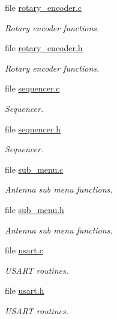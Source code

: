 \begin{CompactItemize}
\item 
file \hyperlink{rotary__encoder_8c}{rotary\_\-encoder.c}
\begin{CompactList}\small\item\em Rotary encoder functions. \item\end{CompactList}

\item 
file \hyperlink{rotary__encoder_8h}{rotary\_\-encoder.h}
\begin{CompactList}\small\item\em Rotary encoder functions. \item\end{CompactList}

\item 
file \hyperlink{sequencer_8c}{sequencer.c}
\begin{CompactList}\small\item\em Sequencer. \item\end{CompactList}

\item 
file \hyperlink{sequencer_8h}{sequencer.h}
\begin{CompactList}\small\item\em Sequencer. \item\end{CompactList}

\item 
file \hyperlink{sub__menu_8c}{sub\_\-menu.c}
\begin{CompactList}\small\item\em Antenna sub menu functions. \item\end{CompactList}

\item 
file \hyperlink{sub__menu_8h}{sub\_\-menu.h}
\begin{CompactList}\small\item\em Antenna sub menu functions. \item\end{CompactList}

\item 
file \hyperlink{front__panel_2usart_8c}{usart.c}
\begin{CompactList}\small\item\em USART routines. \item\end{CompactList}

\item 
file \hyperlink{front__panel_2usart_8h}{usart.h}
\begin{CompactList}\small\item\em USART routines. \item\end{CompactList}

\end{CompactItemize}
